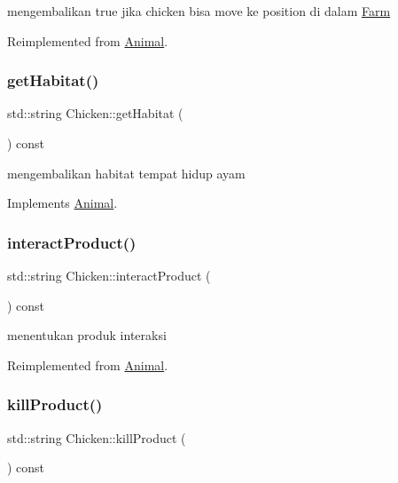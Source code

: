 mengembalikan true jika chicken bisa move ke position di dalam \mbox{\hyperlink{class_farm}{Farm}} 

Reimplemented from \mbox{\hyperlink{class_animal_a0529aaf00a6368ea123110683cc4e2f2}{Animal}}.

\mbox{\label{class_chicken_a04caa14a1505440f93e6c81a387c6f27}} 
\subsubsection{\texorpdfstring{getHabitat()}{getHabitat()}}
{\footnotesize\ttfamily std\+::string Chicken\+::get\+Habitat (\begin{DoxyParamCaption}{ }\end{DoxyParamCaption}) const\hspace{0.3cm}{\ttfamily [virtual]}}

mengembalikan habitat tempat hidup ayam 

Implements \mbox{\hyperlink{class_animal_a3de687fb42b792132a09176c4a0e2125}{Animal}}.

\mbox{\label{class_chicken_abfe91af373fe0e1183cfb52f8ab4b4a0}} 
\subsubsection{\texorpdfstring{interactProduct()}{interactProduct()}}
{\footnotesize\ttfamily std\+::string Chicken\+::interact\+Product (\begin{DoxyParamCaption}{ }\end{DoxyParamCaption}) const\hspace{0.3cm}{\ttfamily [virtual]}}

menentukan produk interaksi 

Reimplemented from \mbox{\hyperlink{class_animal_a8e99d809fbff9cea27dee5a785932dc6}{Animal}}.

\mbox{\label{class_chicken_a31c3c1a46d657c0bfa45de825dc06e53}} 
\subsubsection{\texorpdfstring{killProduct()}{killProduct()}}
{\footnotesize\ttfamily std\+::string Chicken\+::kill\+Product (\begin{DoxyParamCaption}{ }\end{DoxyParamCaption}) const\hspace{0.3cm}{\ttfamily [virtual]}}

